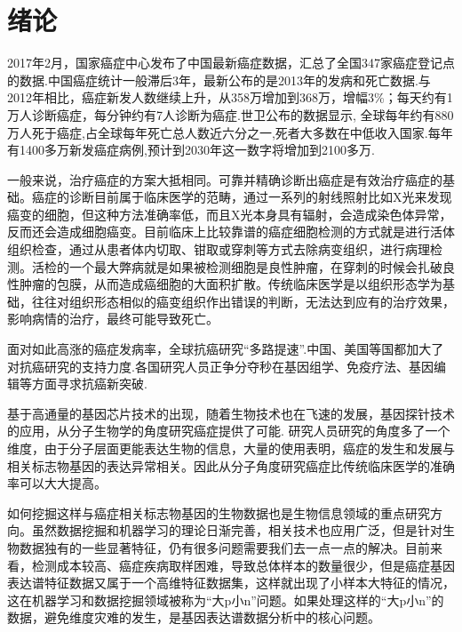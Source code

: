 \documentclass{njubachelor}
\begin{document}
\makectitlepage

\thispagestyle{plain} %
\vspace*{0em}

\maketoc

\newpage
{}

\thispagestyle{plain} %

\section{绪论}

2017年2月，国家癌症中心发布了中国最新癌症数据，汇总了全国347家癌症登记点的数据.中国癌症统计一般滞后3年，最新公布的是2013年的发病和死亡数据.与2012年相比，癌症新发人数继续上升，从358万增加到368万，增幅3\%；每天约有1万人诊断癌症，每分钟约有7人诊断为癌症.世卫公布的数据显示, 全球每年约有880万人死于癌症,占全球每年死亡总人数近六分之一,死者大多数在中低收入国家.每年有1400多万新发癌症病例,预计到2030年这一数字将增加到2100多万.

一般来说，治疗癌症的方案大抵相同。可靠并精确诊断出癌症是有效治疗癌症的基础。癌症的诊断目前属于临床医学的范畴，通过一系列的射线照射比如X光来发现癌变的细胞，但这种方法准确率低，而且X光本身具有辐射，会造成染色体异常，反而还会造成细胞癌变。目前临床上比较靠谱的癌症细胞检测的方式就是进行活体组织检查，通过从患者体内切取、钳取或穿刺等方式去除病变组织，进行病理检测。活检的一个最大弊病就是如果被检测细胞是良性肿瘤，在穿刺的时候会扎破良性肿瘤的包膜，从而造成癌细胞的大面积扩散。传统临床医学是以组织形态学为基础，往往对组织形态相似的癌变组织作出错误的判断，无法达到应有的治疗效果，影响病情的治疗，最终可能导致死亡。

面对如此高涨的癌症发病率，全球抗癌研究“多路提速”.中国、美国等国都加大了对抗癌研究的支持力度.各国研究人员正争分夺秒在基因组学、免疫疗法、基因编辑等方面寻求抗癌新突破.

基于高通量的基因芯片技术的出现，随着生物技术也在飞速的发展，基因探针技术的应用，从分子生物学的角度研究癌症提供了可能. 研究人员研究的角度多了一个维度，由于分子层面更能表达生物的信息，大量的使用表明，癌症的发生和发展与相关标志物基因的表达异常相关。因此从分子角度研究癌症比传统临床医学的准确率可以大大提高。

如何挖掘这样与癌症相关标志物基因的生物数据也是生物信息领域的重点研究方向。虽然数据挖掘和机器学习的理论日渐完善，相关技术也应用广泛，但是针对生物数据独有的一些显著特征，仍有很多问题需要我们去一点一点的解决。目前来看，检测成本较高、癌症疾病取样困难，导致总体样本的数量很少，但是癌症基因表达谱特征数据又属于一个高维特征数据集，这样就出现了小样本大特征的情况，这在机器学习和数据挖掘领域被称为“大p小n”问题。如果处理这样的“大p小n”的数据，避免维度灾难的发生，是基因表达谱数据分析中的核心问题。
\end{document}
